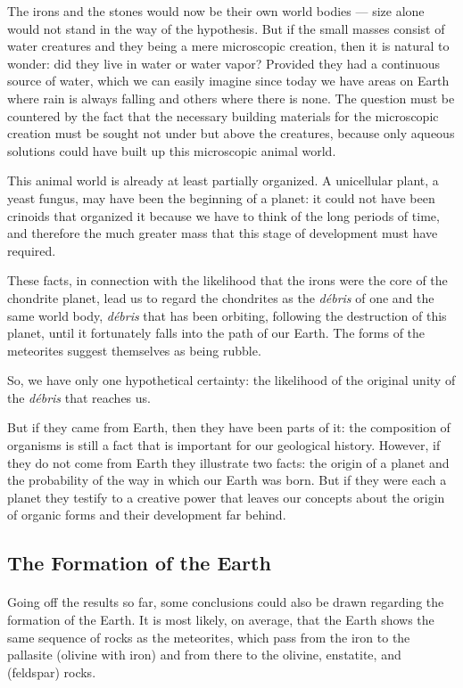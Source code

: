 \documentclass[a4paper, 12pt, oneside]{article}
\begin{document}
The irons and the stones would now be their own world bodies --- size alone would not stand in the way of the hypothesis. But if the small masses consist of water creatures and they being a mere microscopic creation, then it is natural to wonder: did they live in water or water vapor? Provided they had a continuous source of water, which we can easily imagine since today we have areas on Earth where rain is always falling and others where there is none. The question must be countered by the fact that the necessary building materials for the microscopic creation must be sought not under but above the creatures, because only aqueous solutions could have built up this microscopic animal world.

This animal world is already at least partially organized. A unicellular plant, a yeast fungus, may have been the beginning of a planet: it could not have been crinoids that organized it because we have to think of the long periods of time, and therefore the much greater mass that this stage of development must have required.

These facts, in connection with the likelihood that the irons were the core of the chondrite planet, lead us to regard the chondrites as the \emph{débris} of one and the same world body, \emph{débris} that has been orbiting, following the destruction of this planet, until it fortunately falls into the path of our Earth. The forms of the meteorites suggest themselves as being rubble.

So, we have only one hypothetical certainty: the likelihood of the original unity of the \emph{débris} that reaches us.

But if they came from Earth, then they have been parts of it: the composition of organisms is still a fact that is important for our geological history. However, if they do not come from Earth they illustrate two facts: the origin of a planet and the probability of the way in which our Earth was born. But if they were each a planet they testify to a creative power that leaves our concepts about the origin of organic forms and their development far behind.
\clearpage
\subsection{The Formation of the Earth}
\paragraph*{}
Going off the results so far, some conclusions could also be drawn regarding the formation of the Earth. It is most likely, on average, that the Earth shows the same sequence of rocks as the meteorites, which pass from the iron to the pallasite (olivine with iron) and from there to the olivine, enstatite, and (feldspar) rocks.
\end{document}
